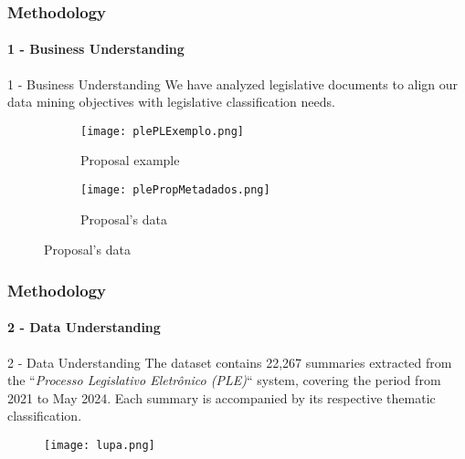 \begin{frame}
	\frametitle{Methodology}
	\framesubtitle{1 - Business Understanding}	
	
	\begin{block}{1 - Business Understanding} 
			We have analyzed legislative documents to align our data mining objectives with legislative classification needs.
	\end{block}


	

	\begin{figure}
		\centering
		\begin{subfigure}[b]{0.4\textwidth}
			\texttt{[image: plePLExemplo.png]}
			\caption{Proposal example}
		\end{subfigure}
		\hspace{0.1\textwidth}
		\begin{subfigure}[b]{0.4\textwidth}
			\texttt{[image: plePropMetadados.png]}
			\caption{Proposal's data}
		\end{subfigure}
	\end{figure}

\end{frame}
\begin{frame}
	\frametitle{Methodology}
	\framesubtitle{2 - Data Understanding}	
	\begin{block}{2 - Data Understanding} 
		The dataset contains 22,267 summaries extracted from the ``\textit{Processo Legislativo Eletrônico (PLE)}`` system, covering the period from 2021 to May 2024. Each summary is accompanied by its respective thematic classification.
	\end{block}

	\begin{figure}
		\texttt{[image: lupa.png]}
	\end{figure}



\end{frame}
